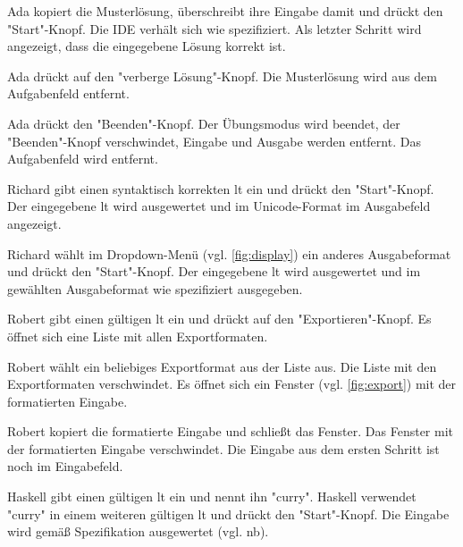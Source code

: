 \documentclass[parskip=full,11pt,twoside]{scrartcl}
\begin{document}
{Ada kopiert die Musterlösung, überschreibt ihre Eingabe damit und drückt den "Start"-Knopf.}
{Die IDE verhält sich wie spezifiziert. 
 Als letzter Schritt wird angezeigt, dass die eingegebene Lösung korrekt ist.}
 
{Ada drückt auf den "verberge Lösung"-Knopf.}
{Die Musterlösung wird aus dem Aufgabenfeld entfernt.}
 
{Ada drückt den "Beenden"-Knopf.}
{Der Übungsmodus wird beendet, der "Beenden"-Knopf verschwindet, Eingabe und Ausgabe werden entfernt.
 Das Aufgabenfeld wird entfernt.}


{Richard gibt einen syntaktisch korrekten \gls{lt} ein und drückt den "Start"-Knopf.}
{Der eingegebene \gls{lt} wird ausgewertet und im Unicode-Format im Ausgabefeld angezeigt.}

{Richard wählt im Dropdown-Menü (vgl. \cref{fig:display}) ein anderes Ausgabeformat und drückt den "Start"-Knopf.}
{Der eingegebene \gls{lt} wird ausgewertet und im gewählten Ausgabeformat wie spezifiziert ausgegeben.}


{Robert gibt einen gültigen \gls{lt} ein und drückt auf den "Exportieren"-Knopf.}
{Es öffnet sich eine Liste mit allen Exportformaten.}

{Robert wählt ein beliebiges Exportformat aus der Liste aus.}
{Die Liste mit den Exportformaten verschwindet.
Es öffnet sich ein Fenster (vgl. \cref{fig:export}) mit der formatierten Eingabe.}

{Robert kopiert die formatierte Eingabe und schließt das Fenster.}
{Das Fenster mit der formatierten Eingabe verschwindet. 
 Die Eingabe aus dem ersten Schritt ist noch im Eingabefeld.}
 

{Haskell gibt einen gültigen \gls{lt} ein und nennt ihn "curry".
 Haskell verwendet "curry" in einem weiteren gültigen \gls{lt} und drückt den "Start"-Knopf.}
{Die Eingabe wird gemäß Spezifikation ausgewertet (vgl. \gls{nb}).}
\end{document}
